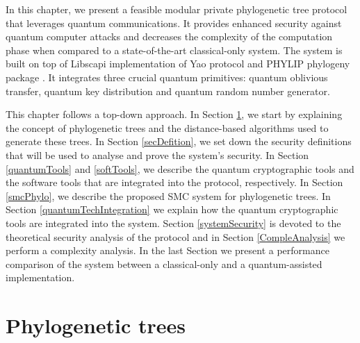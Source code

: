 
In this chapter, we present a feasible modular private phylogenetic tree protocol that leverages quantum communications. It provides enhanced security against quantum computer attacks and decreases the complexity of the computation phase when compared to a state-of-the-art classical-only system. 
The system is built on top of Libscapi \cite{libscapi} implementation of Yao protocol and PHYLIP phylogeny package \cite{PH78}. It integrates three crucial quantum primitives: quantum oblivious transfer, quantum key distribution and quantum random number generator.

This chapter follows a top-down approach. In Section \ref{phyloTree}, we start by explaining the concept of phylogenetic trees and the distance-based algorithms used to generate these trees. In Section \ref{secDefition}, we set down the security definitions that will be used to analyse and prove the system's security. %
In Section \ref{quantumTools} and \ref{softTools}, we describe the quantum cryptographic tools and the software tools that are integrated into the protocol, respectively. In Section \ref{smcPhylo}, we describe the proposed SMC system for phylogenetic trees. In Section \ref{quantumTechIntegration} we explain how the quantum cryptographic tools are integrated into the system. Section \ref{systemSecurity} is devoted to the theoretical security analysis of the protocol and in Section \ref{CompleAnalysis} we perform a complexity analysis. In the last Section we present a performance comparison of the system between a classical-only and a quantum-assisted implementation.



\section{Phylogenetic trees} \label{phyloTree}

